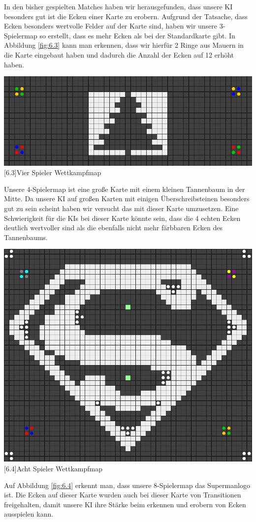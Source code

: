 \documentclass[12pt,a4paper,bibliography=totocnumbered,listof=totocnumbered]{scrartcl}
\begin{document}
	In den bisher gespielten Matches haben wir herausgefunden, dass unsere KI besonders gut ist die Ecken einer Karte zu erobern. Aufgrund der Tatsache, dass Ecken besonders wertvolle Felder auf der Karte sind, haben wir unsere 3-Spielermap so erstellt, dass es mehr Ecken als bei der Standardkarte gibt. In Abbildung \ref{fig:6.3} kann man erkennen, dass wir hierfür 2 Ringe aus Mauern in die Karte eingebaut haben und dadurch die Anzahl der Ecken auf 12 erhöht haben.
	
	\vspace{1em}
	\begin{minipage}{\linewidth}
		\centering
		\includegraphics[width=0.66\linewidth]{pics/Kapitel_6/TannenbaumMap.PNG}
		[6.3]{Vier Spieler Wettkampfmap}
		\label{fig:6.3}
	\end{minipage}
	\vspace{1em}
	
	Unsere 4-Spielermap ist eine große Karte mit einem kleinen Tannenbaum in der Mitte. Da unsere KI auf großen Karten mit einigen Überschreibsteinen besonders gut zu sein scheint haben wir versucht das mit dieser Karte umzusetzen. Eine Schwierigkeit für die KIs bei dieser Karte könnte sein, dass die 4 echten Ecken deutlich wertvoller sind als die ebenfalls nicht mehr färbbaren Ecken des Tannenbaums.
	
		\vspace{1em}
	\begin{minipage}{\linewidth}
		\centering
		\includegraphics[width=0.66\linewidth]{pics/Kapitel_6/SupermanMap.png}
		[6.4]{Acht Spieler Wettkampfmap}
		\label{fig:6.4}
	\end{minipage}
	\vspace{1em}
	 Auf Abbildung \ref{fig:6.4} erkennt man, dass unsere 8-Spielermap das Supermanlogo ist. Die Ecken auf dieser Karte wurden auch bei dieser Karte von Transitionen freigehalten, damit unsere KI ihre Stärke beim erkennen und erobern von Ecken ausspielen kann.
	
\end{document}
